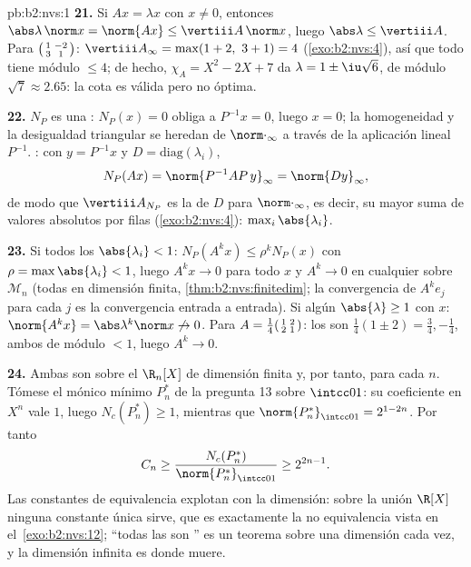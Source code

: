 \begin{solution}{pb:b2:nvs:1}
\textbf{21.} Si $Ax = \lambda x$ con $x \neq 0$, entonces
$\abs\lambda\,\norm x = \norm{Ax} \leq \vertiii A\,\norm x$, luego
$\abs\lambda \leq \vertiii A$. Para $\begin{psmallmatrix}1 & -2\\
3 & 1\end{psmallmatrix}$: $\vertiii A_\infty = \max(1 + 2,\ 3 + 1)
= 4$ (\cref{exo:b2:nvs:4}), así que todo  tiene módulo
$\leq 4$; de hecho, $\chi_A = X^2 - 2X + 7$ da $\lambda = 1 \pm
\iu\sqrt6$, de módulo $\sqrt7 \approx 2.65$: la cota es válida
pero no óptima.

\textbf{22.} $N_P$ es una : $N_P(x) = 0$ obliga a $P^{-1}x =
0$, luego $x = 0$; la homogeneidad y la desigualdad triangular se
heredan de $\norm\cdot_\infty$ a través de la aplicación lineal
$P^{-1}$. : con $y = P^{-1}x$ y $D =
\mathrm{diag}(\lambda_i)$,
\[
N_P(Ax) = \norm{P^{-1}AP\,y}_\infty = \norm{Dy}_\infty,
\]
de modo que $\vertiii A_{N_P}$ es la  de $D$ para
$\norm\cdot_\infty$, es decir, su mayor suma de valores absolutos
por filas (\cref{exo:b2:nvs:4}): $\max_i\abs{\lambda_i}$.

\textbf{23.} Si todos los $\abs{\lambda_i} < 1$: $N_P(A^kx) \leq
\rho^kN_P(x)$ con $\rho = \max\abs{\lambda_i} < 1$, luego $A^kx
\to 0$ para todo $x$ y $A^k \to 0$ en cualquier  sobre
$\mathcal{M}_n$ (todas  en dimensión finita,
\cref{thm:b2:nvs:finitedim}; la convergencia de $A^ke_j$ para cada
$j$ es la convergencia entrada a entrada). Si algún $\abs{\lambda}
\geq 1$ con  $x$: $\norm{A^kx} =
\abs\lambda^k\norm x \not\to 0$. Para $A =
\frac14\begin{psmallmatrix}1 & 2\\ 2 & 1\end{psmallmatrix}$: los
 son $\frac14(1 \pm 2) = \frac34, -\frac14$, ambos
de módulo $< 1$, luego $A^k \to 0$.

\textbf{24.} Ambas son  sobre el $\R_n[X]$ de dimensión
finita y, por tanto,  para cada $n$. Tómese el mónico
mínimo $P^*_n$ de la pregunta 13 sobre $\intcc01$: su coeficiente
en $X^n$ vale $1$, luego $N_c(P^*_n) \geq 1$, mientras que
$\norm{P^*_n}_{\intcc01} = 2^{1-2n}$. Por tanto
\[
C_n \geq \frac{N_c(P^*_n)}{\norm{P^*_n}_{\intcc01}}
\geq 2^{2n-1} .
\]
Las constantes de equivalencia explotan con la dimensión: sobre la
unión $\R[X]$ ninguna constante única sirve, que es exactamente la
no equivalencia vista en el~\cref{exo:b2:nvs:12}; ``todas las
 son '' es un teorema sobre una dimensión cada
vez, y la dimensión infinita es donde muere.


\end{solution}
